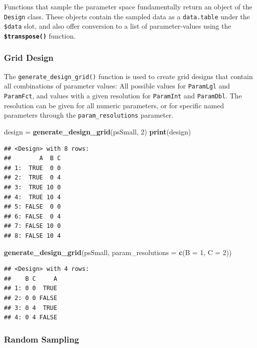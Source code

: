 \documentclass[]{scrbook}
\newenvironment{Shaded}{\begin{snugshade}}{\end{snugshade}}
\newcommand{\DataTypeTok}[1]{\textcolor[rgb]{0.13,0.29,0.53}{#1}}
\newcommand{\DecValTok}[1]{\textcolor[rgb]{0.00,0.00,0.81}{#1}}
\newcommand{\KeywordTok}[1]{\textcolor[rgb]{0.13,0.29,0.53}{\textbf{#1}}}
\newcommand{\NormalTok}[1]{#1}
\newcommand{\StringTok}[1]{\textcolor[rgb]{0.31,0.60,0.02}{#1}}
\renewenvironment{Shaded} {\begin{snugshade}\small} {\end{snugshade}}
\begin{document}
Functions that sample the parameter space fundamentally return an object of the \texttt{Design} class.
These objects contain the sampled data as a \texttt{data.table} under the \texttt{\$data} slot, and also offer conversion to a list of parameter-values using the \textbf{\texttt{\$transpose()}} function.

\hypertarget{grid-design}{%
\subsubsection{Grid Design}\label{grid-design}}

The \texttt{generate\_design\_grid()} function is used to create grid designs that contain all combinations of parameter values: All possible values for \texttt{ParamLgl} and \texttt{ParamFct}, and values with a given resolution for \texttt{ParamInt} and \texttt{ParamDbl}.
The resolution can be given for all numeric parameters, or for specific named parameters through the \texttt{param\_resolutions} parameter.

\begin{Shaded}
\begin{Highlighting}[]
\NormalTok{design =}\StringTok{ }\KeywordTok{generate_design_grid}\NormalTok{(psSmall, }\DecValTok{2}\NormalTok{)}
\KeywordTok{print}\NormalTok{(design)}
\end{Highlighting}
\end{Shaded}

\begin{verbatim}
## <Design> with 8 rows:
##        A  B C
## 1:  TRUE  0 0
## 2:  TRUE  0 4
## 3:  TRUE 10 0
## 4:  TRUE 10 4
## 5: FALSE  0 0
## 6: FALSE  0 4
## 7: FALSE 10 0
## 8: FALSE 10 4
\end{verbatim}

\begin{Shaded}
\begin{Highlighting}[]
\KeywordTok{generate_design_grid}\NormalTok{(psSmall, }\DataTypeTok{param_resolutions =} \KeywordTok{c}\NormalTok{(}\DataTypeTok{B =} \DecValTok{1}\NormalTok{, }\DataTypeTok{C =} \DecValTok{2}\NormalTok{))}
\end{Highlighting}
\end{Shaded}

\begin{verbatim}
## <Design> with 4 rows:
##    B C     A
## 1: 0 0  TRUE
## 2: 0 0 FALSE
## 3: 0 4  TRUE
## 4: 0 4 FALSE
\end{verbatim}

\hypertarget{random-sampling}{%
\subsubsection{Random Sampling}\label{random-sampling}}
\end{document}
